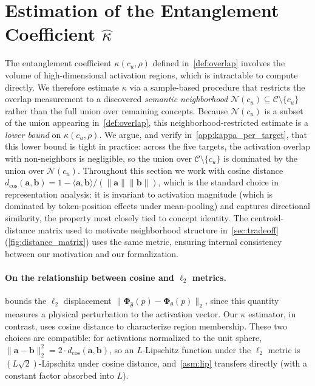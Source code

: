 \section{Estimation of the Entanglement Coefficient $\hat\kappa$}
\label{app:kappa_estimation}

The entanglement coefficient $\kappa(c_u, \rho)$ defined in~\cref{def:overlap} involves the volume of high-dimensional activation regions, which is intractable to compute directly. We therefore estimate $\kappa$ via a sample-based procedure that restricts the overlap measurement to a discovered \emph{semantic neighborhood} $\mathcal{N}(c_u) \subseteq \mathcal{C} \setminus \{c_u\}$ rather than the full union over remaining concepts. Because $\mathcal{N}(c_u)$ is a subset of the union appearing in~\cref{def:overlap}, this neighborhood-restricted estimate is a \emph{lower bound} on $\kappa(c_u, \rho)$. 
We argue, and verify in~\cref{app:kappa_per_target}, that this lower bound is tight in practice: across the five targets, the activation overlap with non-neighbors is negligible, so the union over $\mathcal{C} \setminus \{c_u\}$ is dominated by the union over $\mathcal{N}(c_u)$. 
Throughout this section we work with cosine distance $d_{\cos}(\mathbf{a}, \mathbf{b}) = 1 - \langle \mathbf{a}, \mathbf{b} \rangle / (\|\mathbf{a}\|\|\mathbf{b}\|)$, which is the standard choice in representation analysis: it is invariant to activation magnitude (which is dominated by token-position effects under mean-pooling) and captures directional similarity, the property most closely tied to concept identity. 
The centroid-distance matrix used to motivate neighborhood structure in~\cref{sec:tradeoff} (\cref{fig:distance_matrix}) uses the same metric, ensuring internal consistency between our motivation and our formalization.


\paragraph{On the relationship between cosine and $\ell_2$ metrics.}
 bounds the $\ell_2$ displacement $\|\boldsymbol{\Phi}_{\hat\theta}(p) - \boldsymbol{\Phi}_{\theta}(p)\|_2$, since this quantity measures a physical perturbation to the activation vector. Our $\kappa$ estimator, in contrast, uses cosine distance to characterize region membership. These two choices are compatible: for activations normalized to the unit sphere, $\|\mathbf{a} - \mathbf{b}\|_2^2 = 2 \cdot d_{\cos}(\mathbf{a}, \mathbf{b})$, so an $L$-Lipschitz function under the $\ell_2$ metric is $(L\sqrt{2})$-Lipschitz under cosine distance, and~\cref{asm:lip} transfers directly (with a constant factor absorbed into $L$). 

